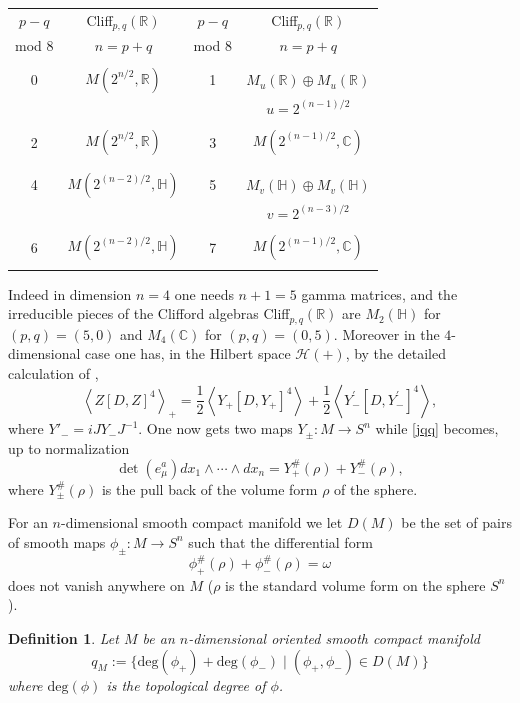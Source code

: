 \documentclass[12pt]{article}
\newtheorem{defn}[thm]{Definition}
\def\C{{\mathbb C}}
\def\R{{\mathbb R}}
\def\H{{\mathbb H}}
\def\cH{{\mathcal H}}
\def\H{{\mathbb H}}
\begin{document}
\bigskip 

\begin{center}
\begin{tabular}{|c|c||c|c|}
  \hline
  $p-q$  &  Cliff$_{p,q}(\R)$&$p-q$  &  Cliff$_{p,q}(\R)$\\
  mod $8$ & $n=p+q$& mod $8$& $n=p+q$\\
   \hline
    & &&\\
 0 &  $M(2^{n/2},\R)$& 1 &$M_u(\R)\oplus M_u(\R)$ \\
 &&& $u=2^{(n-1)/2}$\\
  \hline
  & &&\\
  2  &  $M(2^{n/2},\R)$& 3&$M(2^{(n-1)/2},\C)$ \\
  &&&\\
  \hline
  &&& \\
 4&     $M(2^{(n-2)/2},\H)$& 5& $M_v(\H)\oplus M_v(\H)$\\
    &&& $v=2^{(n-3)/2}$\\
  \hline
  & & &\\
  6 &   $M(2^{(n-2)/2},\H)$ & 7 & $M(2^{(n-1)/2},\C)$\\
  &&&\\
    \hline
    \end{tabular}
\bigskip
\end{center}
Indeed in dimension $n=4$  one needs $n+1=5$ gamma matrices, and the irreducible pieces of the Clifford algebras Cliff$_{p,q}(\R)$ are $M_{2}(\mathbb{H})$ for $(p,q)=(5,0)$ and $M_{4}(\mathbb{C})$ for $(p,q)=(0,5)$. Moreover 
in the $4$-dimensional case one has, in the Hilbert space $\cH(+)$, by the detailed calculation of \cite{acmu2},
\[
\left\langle Z\left[  D,Z\right]  ^{4} \right\rangle_{+} =\frac{1}{2}\left\langle
Y_{+}\left[  D,Y_{+}\right]  ^{4} \right\rangle +\frac{1}{2}\left\langle Y_{-}^{\prime
}\left[  D,Y_{-}^{\prime}\right]  ^{4} \right\rangle ,
\]
where $Y'_{-}=i J Y_{-}J^{-1}$. 
One
now gets two maps $Y_{\pm}:M\rightarrow S^{n}$ while  \eqref{jqq}
becomes, up to normalization
\begin{equation}
\det\left(  e_{\mu}^{a}\right)  dx_{1}\wedge\cdots\wedge dx_{n}  =Y^{\#}_{+}(\rho)+Y^{\#}_{-}(\rho), \label{qqq}
\end{equation}
where $Y^{\#}_{\pm}(\rho)$ is the pull back of the  volume   form $\rho$
of the sphere.

For an $n$-dimensional smooth compact manifold we let 
$D(M)$ be the set of pairs of smooth maps
$\phi_{\pm}:M\rightarrow S^{n}$ such that the differential form
\[
\phi_{+}^{\#}(\rho)+\phi_{-}^{\#}(\rho)=\omega
\]
does not vanish anywhere on $M$ 
($\rho$ is the standard volume form on the sphere $S^{n}$).
\begin{defn} Let $M$ be an $n$-dimensional oriented smooth compact manifold
\[
q_M:=\{\mathrm{deg}(\phi_{+})+\mathrm{deg}(\phi_{-})\mid(\phi_{+}%
,\phi_{-})\in D(M)\}
\]
where $\mathrm{deg}(\phi)$ is the topological degree of 
$\phi$.	
\end{defn}
\end{document}
